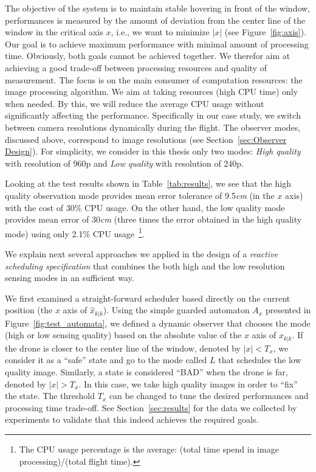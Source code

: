 \documentclass[ twoside, 12pt ]{article}
\begin{document}
The objective of the system is to maintain stable hovering in front of the window, performances is measured by the amount of deviation from the center line of the window in the critical axis $x$, i.e., we want to minimize $\left| x \right|$ (see Figure~\ref{fig:axis}).
Our goal is to achieve maximum performance with minimal amount of processing time.
Obviously, both goals cannot be achieved together. We therefor aim at achieving a good trade-off between processing resources and quality of measurement. The focus is on the main consumer of computation resources: the image processing algorithm.
We aim at taking resources (high CPU time) only when needed. By this, we will reduce the average CPU usage without significantly affecting the performance.
Specifically in our case study, we switch between camera resolutions dynamically during the flight. The observer modes, discussed above, correspond to image resolutions (see Section~\ref{sec:Observer Design}).
For simplicity, we consider in this thesis only two modes: \textit{High quality} with resolution of 960p and \textit{Low quality} with resolution of 240p.

Looking at the test results shown in Table~\ref{tab:results}, we see that the high quality observation mode provides mean error tolerance of 9.5\textit{cm} (in the $x$ axis) with the cost of 30\% CPU usage.
On the other hand, the low quality mode provides mean error of 30\textit{cm} (three times the error obtained in the high quality mode) using only 2.1\% CPU usage~\footnote{The CPU usage percentage is the average: (total time spend in image processing)/(total flight time). }.

We explain next several approaches we applied in the design of a \textit{reactive scheduling specification} that combines the both high and the low resolution sensing modes in an sufficient way.

We first examined a straight-forward scheduler based directly on the current position (the $x$ axis of $\hat{x}_{k|k}$). Using the simple guarded automaton $A_{x}$ presented in Figure~\ref{fig:test_automata}, we defined a dynamic observer that chooses the mode (high or low sensing quality) based on the absolute value of the $x$ axis of $\hat{x}_{k|k}$. If the drone is closer to the center line of the window, denoted by $|x| < T_x$, we consider it as a ``safe'' state and go to the mode called $L$ that schedules the low quality image.
Similarly, a state is considered ``BAD'' when the drone is far, denoted by $|x| > T_x$. In this case, we take high quality images in order to ``fix'' the state.
The threshold $T_x$ can be changed to tune the desired performances and processing time trade-off.
See Section~\ref{sec:results} for the data we collected by experiments to validate that this indeed achieves the required goals. 
\end{document}
